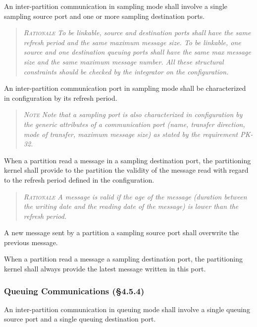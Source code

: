 An inter-partition communication in sampling mode shall involve a single sampling source port and one or more sampling destination ports.
\begin{quote}\it
\textsc{Rationale}
To be linkable, source and destination ports shall have the same refresh period and the same maximum message size.  To be linkable, one source and one destination queuing ports shall have the same max message size and the same maximum message number. All these structural constraints should be checked by the integrator on the configuration.
\end{quote}

An inter-partition communication port in sampling mode shall be characterized in configuration by its refresh period.
\begin{quote}\it
\textsc{Note}
Note that a sampling port is also characterized in configuration by the generic attributes of a communication port (name, transfer direction, mode of transfer, maximum message size)  as stated by the requirement PK-32.
\end{quote}

When a partition read a message in a sampling destination port, the partitioning kernel shall provide to the partition the validity of the  message read with regard to the  refresh period defined in the configuration.
\begin{quote}\it
\textsc{Rationale}
A message is valid if the age of the message (duration between the writing date and the reading date of the message) is lower than the refresh period.
\end{quote}

A new message sent by a partition a sampling source port shall overwrite the previous message.

When a partition read a message a sampling  destination port, the partitioning kernel shall always provide the latest message written  in this port.

\subsubsection{Queuing Communications (\S4.5.4)}

An inter-partition communication in queuing mode shall involve a single queuing source port and a single queuing destination port.

